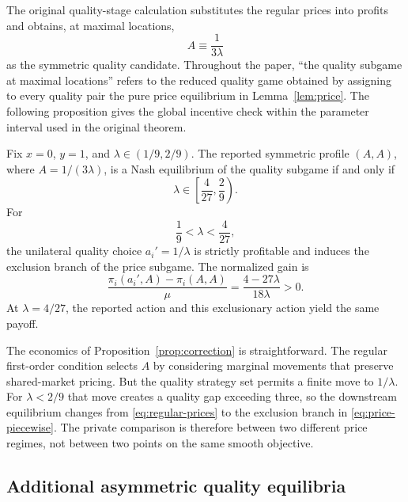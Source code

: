 The original quality-stage calculation substitutes the regular prices into profits and obtains, at maximal locations,
\begin{equation}\label{eq:A}
 A\equiv \frac{1}{3\lambda}
\end{equation}
as the symmetric quality candidate. Throughout the paper, ``the quality subgame at maximal locations'' refers to the reduced quality game obtained by assigning to every quality pair the pure price equilibrium in Lemma~\ref{lem:price}. The following proposition gives the global incentive check within the parameter interval used in the original theorem.

\begin{proposition}\label{prop:correction}
Fix $x=0$, $y=1$, and $\lambda\in(1/9,2/9)$. The reported symmetric profile $(A,A)$, where $A=1/(3\lambda)$, is a Nash equilibrium of the quality subgame if and only if
\begin{equation}\label{eq:symmetric-survival}
 \lambda\in\left[\frac{4}{27},\frac{2}{9}\right).
\end{equation}
For
\begin{equation}\label{eq:failure-region}
 \frac19<\lambda<\frac4{27},
\end{equation}
the unilateral quality choice $a_i'=1/\lambda$ is strictly profitable and induces the exclusion branch of the price subgame. The normalized gain is
\begin{equation}\label{eq:global-gain}
 \frac{\pi_i(a_i',A)-\pi_i(A,A)}{\mu}
 =\frac{4-27\lambda}{18\lambda}>0.
\end{equation}
At $\lambda=4/27$, the reported action and this exclusionary action yield the same payoff.
\end{proposition}

The economics of Proposition~\ref{prop:correction} is straightforward. The regular first-order condition selects $A$ by considering marginal movements that preserve shared-market pricing. But the quality strategy set permits a finite move to $1/\lambda$. For $\lambda<2/9$ that move creates a quality gap exceeding three, so the downstream equilibrium changes from \eqref{eq:regular-prices} to the exclusion branch in \eqref{eq:price-piecewise}. The private comparison is therefore between two different price regimes, not between two points on the same smooth objective.

\subsection{Additional asymmetric quality equilibria}\label{subsec:asymmetric}

